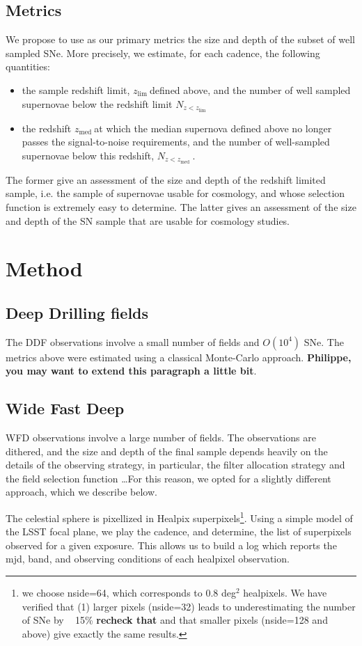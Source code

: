 \documentclass [11pt,a4paper]{article}
\newcommand{\zlim}{$z_{\mathrm{lim}}\ $}
\newcommand{\nsnlim}{$N_{z<z_{\mathrm{lim}}}\ $}
\newcommand{\zmed}{$z_{\mathrm{med}}\ $}
\newcommand{\nsnmed}{$N_{z<z_{\mathrm{med}}}\ $}
\newcommand{\FixMe}[1]{{\color{red} \bf \large #1}}
\begin{document}
\subsection{Metrics}

We propose to use as our primary metrics the size and depth of the
subset of well sampled SNe.  More precisely, we estimate, for each
cadence, the following quantities:

\begin{itemize}
\item the sample redshift limit, \zlim defined above, and the number
  of well sampled supernovae below the redshift limit \nsnlim
\item the redshift \zmed at which the median supernova defined above
  no longer passes the signal-to-noise requirements, and the number of
  well-sampled supernovae below this redshift, \nsnmed.  
\end{itemize}
The former give an assessment of the size and depth of the redshift
limited sample, i.e. the sample of supernovae usable for cosmology,
and whose selection function is extremely easy to determine.  The
latter gives an assessment of the size and depth of the SN sample that
are usable for cosmology studies.


\section{Method}

\subsection{Deep Drilling fields}
The DDF  observations involve a  small number of fields  and $O(10^4)$
SNe.  The metrics  above were estimated using  a classical Monte-Carlo
approach. \FixMe{Philippe,  you may  want to  extend this  paragraph a
  little bit}.

\subsection{Wide Fast Deep}
WFD observations involve a large number of fields.  The observations
are dithered, and the size and depth of the final sample depends
heavily on the details of the observing strategy, in particular, the
filter allocation strategy and the field selection function \ldots For
this reason, we opted for a slightly different approach, which we
describe below.

The celestial sphere is pixellized in Healpix superpixels\footnote{we
  choose nside=64, which corresponds to 0.8 deg$^2$ healpixels.  We
  have verified that (1) larger pixels (nside=32) leads to
  underestimating the number of SNe by ~ 15\% \FixMe{recheck that} and
  that smaller pixels (nside=128 and above) give exactly the same
  results.}.  Using a simple model of the LSST focal plane, we play
the cadence, and determine, the list of superpixels observed for a
given exposure. This allows us to build a log which reports the mjd,
band, and observing conditions of each healpixel observation.
\end{document}
